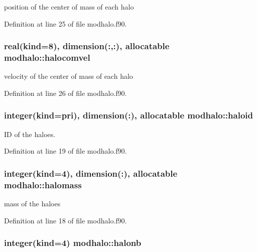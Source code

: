 position of the center of mass of each halo 



Definition at line 25 of file modhalo.\-f90.

\hypertarget{classmodhalo_ad9aa6bd557e4766c0d1d612e203a1e67}{
\subsubsection[{halocomvel}]{\setlength{\rightskip}{0pt plus 5cm}real(kind=8), dimension(\-:,\-:), allocatable modhalo\-::halocomvel}}\label{classmodhalo_ad9aa6bd557e4766c0d1d612e203a1e67}


velocity of the center of mass of each halo 



Definition at line 26 of file modhalo.\-f90.

\hypertarget{classmodhalo_a28d1d14569d3cd370d375aca76fd838c}{
\subsubsection[{haloid}]{\setlength{\rightskip}{0pt plus 5cm}integer(kind=pri), dimension(\-:), allocatable modhalo\-::haloid}}\label{classmodhalo_a28d1d14569d3cd370d375aca76fd838c}


I\-D of the haloes. 



Definition at line 19 of file modhalo.\-f90.

\hypertarget{classmodhalo_a22da1dc93c68210ac3c692f1fb545bc0}{
\subsubsection[{halomass}]{\setlength{\rightskip}{0pt plus 5cm}integer(kind=4), dimension(\-:), allocatable modhalo\-::halomass}}\label{classmodhalo_a22da1dc93c68210ac3c692f1fb545bc0}


mass of the haloes 



Definition at line 18 of file modhalo.\-f90.

\hypertarget{classmodhalo_a7a64076c8448a822872da06cfb3e98f6}{
\subsubsection[{halonb}]{\setlength{\rightskip}{0pt plus 5cm}integer(kind=4) modhalo\-::halonb}}\label{classmodhalo_a7a64076c8448a822872da06cfb3e98f6}


